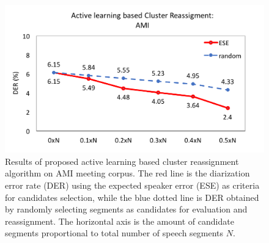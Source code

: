 \documentclass[journal,10pt]{IEEEtran}
\begin{document}
\begin{figure}
	\includegraphics[width=\linewidth]{figs/exp2_2}
	\caption{Results of proposed active learning based cluster reassignment algorithm on AMI meeting corpus. The red line is the diarization error rate (DER) using the expected speaker error (ESE) as criteria for candidates selection, while the blue dotted line is DER obtained by randomly selecting segments as candidates for evaluation and reassignment. The horizontal axis is the amount of candidate segments proportional to total number of speech segments $N$.}
	\label{exp2_1}
\end{figure}
\end{document}
